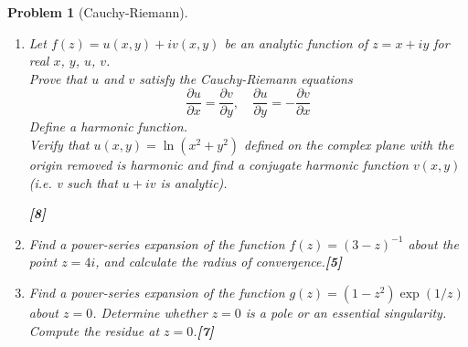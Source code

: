 \documentclass[a4paper]{article}
\theoremstyle{new}
\newtheorem{qns}{Problem}[section]
\begin{document}
\begin{qns}[Cauchy-Riemann]\leavevmode
\begin{enumerate}[label=(\alph*)]
\item Let $f(z) = u(x, y) + iv(x, y)$ be an analytic function of $z = x + iy$ for real $x$, $y$, $u$, $v$.\\[5pt] 
Prove that $u$ and $v$ satisfy the Cauchy-Riemann equations
$$\frac{\partial u}{\partial x}=\frac{\partial v}{\partial y},\quad\frac{\partial u}{\partial y}=-\frac{\partial v}{\partial x}$$
Define a harmonic function.\\[5pt]
Verify that $u(x, y) = \ln(x^2 + y^2)$ defined on the complex plane with the origin removed is harmonic and find a conjugate harmonic function $v(x, y)$ (i.e. v such that $u + iv$ is analytic).

\hfill\textbf{[8]}
\item Find a power-series expansion of the function $f(z) = (3 − z)^{−1}$ about the point $z = 4i$, and calculate the radius of convergence.\hfill\textbf{[5]}
\item Find a power-series expansion of the function $g(z) = (1−z^2)\exp(1/z)$ about $z = 0$. Determine whether $z = 0$ is a pole or an essential singularity. Compute the residue at $z = 0$.\hfill\textbf{[7]}
\end{enumerate}
\end{qns}
\end{document}

